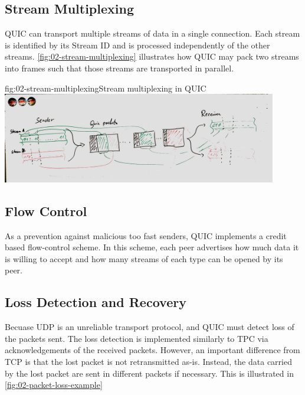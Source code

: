 \subsection{Stream Multiplexing}

QUIC can transport multiple streams of data in a single connection. Each stream is identified by its
Stream ID and is processed independently of the other streams. \autoref{fig:02-stream-multiplexing}
illustrates how QUIC may pack two streams into frames such that those streams are transported in
parallel.

\begin{myFigure}{fig:02-stream-multiplexing}{Stream multiplexing in QUIC}
  \includegraphics[width=0.9\textwidth]{img/02-stream-multiplexing}
\end{myFigure}

\subsection{Flow Control}

As a prevention against malicious too fast senders, QUIC implements a credit based flow-control
scheme. In this scheme, each peer advertises how much data it is willing to accept and how many
streams of each type can be opened by its peer.

\subsection{Loss Detection and Recovery}

Becuase UDP is an unreliable transport protocol, and QUIC must detect loss of the packets sent. The
loss detection is implemented similarly to TPC via acknowledgements of the received packets.
However, an important difference from TCP is that the lost packet is not retransmitted as-is.
Instead, the data carried by the lost packet are sent in different packets if necessary. This is
illustrated in \autoref{fig:02-packet-loss-example}

